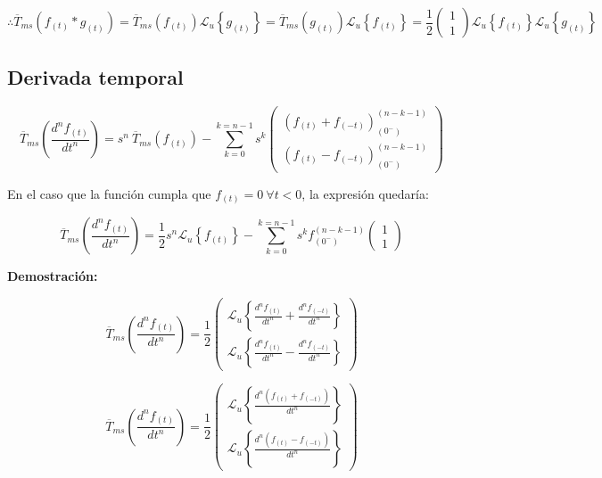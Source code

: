 \documentclass[12pt]{article}
\begin{document}
$$
\therefore \overline{T}_{ms}(f_{(t)} * g_{(t)}) = 
 \overline{T}_{ms}(f_{(t)})\mathcal{L}_u\left\{g_{(t)} \right\} = 
 \overline{T}_{ms}(g_{(t)}) \mathcal{L}_u\left\{f_{(t)} \right\} =\frac12 \begin{pmatrix}
1\\1
\end{pmatrix}\mathcal{L}_u\left\{f_{(t)} \right\}\mathcal{L}_u\left\{g_{(t)} \right\}
$$




\subsection{Derivada temporal}

\begin{equation}\overline{T}_{ms}\left(\frac{d^n f_{(t)}}{dt^n}\right) =s^n\  \overline{T}_{ms}(f_{(t)})
- \sum\limits_{k=0}^{k=n-1} s^k
\begin{pmatrix}
 (f_{(t)} + f_{(-t)})^{(n-k-1)}_{(0^-)}\\[0.5 cm]
 (f_{(t)} - f_{(-t)})^{(n-k-1)}_{(0^-)}
\end{pmatrix}
\label{derivada}
\end{equation}

En el caso que la función cumpla que $f_{(t)} = 0 \ \forall t < 0$, la expresión quedaría:

$$\overline{T}_{ms}\left(\frac{d^n f_{(t)}}{dt^n}\right) = \frac12 s^n\mathcal{L}_u\left\{f_{(t)}\right\} -\sum\limits_{k=0}^{k=n-1} s^k f^{(n-k-1)}_{(0^-)}
\begin{pmatrix}
1\\
1
\end{pmatrix}
$$

{\bfseries Demostración:}

$$\overline{T}_{ms}\left(\frac{d^n f_{(t)}}{dt^n}\right) = \frac12
\begin{pmatrix}
\mathcal{L}_u\left\{\frac{d^n f_{(t)}}{dt^n} + \frac{d^n f_{(-t)}}{dt^n}\right\}\\[0.2 cm]
\mathcal{L}_u\left\{\frac{d^n f_{(t)}}{dt^n} - \frac{d^n f_{(-t)}}{dt^n}\right\}
\end{pmatrix}
$$

$$\overline{T}_{ms}\left(\frac{d^n f_{(t)}}{dt^n}\right) = \frac12
\begin{pmatrix}
\mathcal{L}_u\left\{\frac{d^n (f_{(t)} +f_{(-t)})}{dt^n}\right\}\\[0.2 cm]
\mathcal{L}_u\left\{\frac{d^n (f_{(t)}- f_{(-t)})}{dt^n}\right\}
\end{pmatrix}
$$
\end{document}
